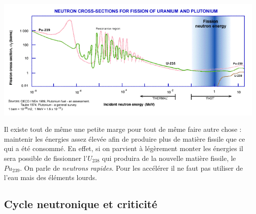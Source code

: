 \begin{center}
	\includegraphics[scale=0.67]{ch1/image5.png}
\end{center}

Il existe tout de même une petite marge pour tout de même faire autre chose : maintenir les énergies 
assez élevée afin de produire plus de matière fissile que ce qui a été consommé. En effet, si on 
parvient à légèrement monter les énergies il sera possible de fissionner l'$U_{238}$ qui produira 
de la nouvelle matière fissile, le $Pu_{239}$. On parle de \textit{neutrons rapides}. Pour les 
accélérer il ne faut pas utiliser de l'eau mais des éléments lourds.



\subsection{Cycle neutronique et criticité}
